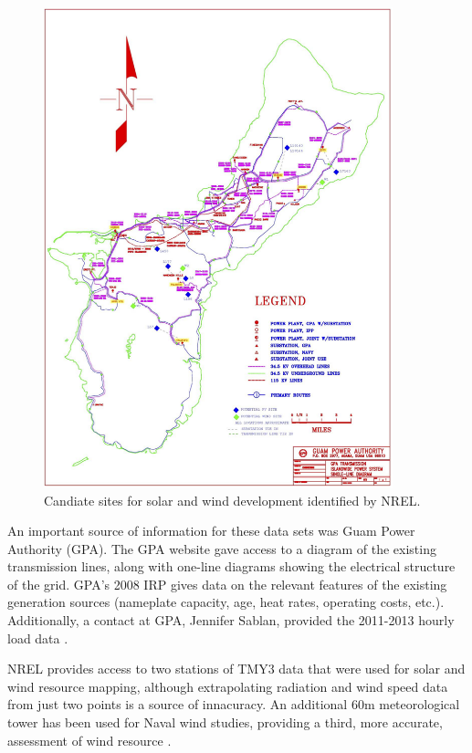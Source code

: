 \documentclass[12pt,letterpaper,fleqn]{article}
\begin{document}
\begin{figure}[!h]
  \centering
  \includegraphics[width=0.9\textwidth]{img/sites}
  \caption{Candiate sites for solar and wind development identified by
    NREL.}
  \label{fig:sites}
\end{figure}

An important source of information for these data sets was Guam Power
Authority (GPA). The GPA website gave access to a diagram of the
existing transmission lines, along with one-line diagrams showing the
electrical structure of the grid. GPA's 2008 IRP gives data on the
relevant features of the existing generation sources (nameplate
capacity, age, heat rates, operating costs, etc.). Additionally, a
contact at GPA, Jennifer Sablan, provided the 2011-2013 hourly load
data \cite{sablan}.

NREL provides access to two stations of TMY3 data that were used for
solar and wind resource mapping, although extrapolating radiation and
wind speed data from just two points is a source of innacuracy. An
additional 60m meteorological tower has been used for Naval wind
studies, providing a third, more accurate, assessment of wind resource
\cite{nrel09}. 
\end{document}
